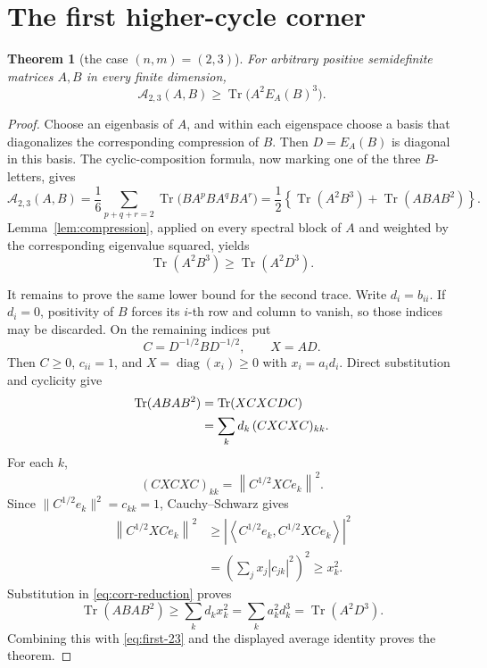 \documentclass[11pt]{article}
\newtheorem{theorem}{Theorem}[section]
\newcommand{\Tr}{\operatorname{Tr}}
\newcommand{\Aav}{\mathcal A}
\newcommand{\EA}{E_A}
\begin{document}
\section{The first higher-cycle corner}
\begin{theorem}[the case \((n,m)=(2,3)\)]\label{thm:twothree}
For arbitrary positive semidefinite matrices \(A,B\) in every finite
dimension,
\[
 \Aav_{2,3}(A,B)\geq \Tr\bigl(A^2\EA(B)^3\bigr).
\]
\end{theorem}
\begin{proof}
Choose an eigenbasis of \(A\), and within each eigenspace choose a basis
that diagonalizes the corresponding compression of \(B\). Then
\(D=\EA(B)\) is diagonal in this basis. The cyclic-composition formula,
now marking one of the three \(B\)-letters, gives
\[
 \Aav_{2,3}(A,B)
 =\frac{1}{6}\sum_{p+q+r=2}
   \Tr\bigl(BA^pBA^qBA^r\bigr)
 =\frac12\left\{\Tr(A^2B^3)+\Tr(ABAB^2)\right\}.
\]
Lemma~\ref{lem:compression}, applied on every spectral block of \(A\) and
weighted by the corresponding eigenvalue squared, yields
\begin{equation}\label{eq:first-23}
 \Tr(A^2B^3)\geq\Tr(A^2D^3).
\end{equation}

It remains to prove the same lower bound for the second trace. Write
\(d_i=b_{ii}\). If \(d_i=0\), positivity of \(B\) forces its \(i\)-th row
and column to vanish, so those indices may be discarded. On the remaining
indices put
\[
 C=D^{-1/2}BD^{-1/2},
 \qquad X=AD.
\]
Then \(C\geq0\), \(c_{ii}=1\), and \(X=\operatorname{diag}(x_i)\geq0\)
with \(x_i=a_i d_i\). Direct substitution and cyclicity give
\begin{align}
 \Tr(ABAB^2)
 &=\Tr(XCXC DC)\notag\\
 &=\sum_k d_k\,(CXCXC)_{kk}.\label{eq:corr-reduction}
\end{align}
For each \(k\),
\[
 (CXCXC)_{kk}
 =\left\|C^{1/2}XC e_k\right\|^2.
\]
Since \(\|C^{1/2}e_k\|^2=c_{kk}=1\), Cauchy--Schwarz gives
\begin{align*}
 \left\|C^{1/2}XC e_k\right\|^2
 &\geq
 \left|\left\langle C^{1/2}e_k,C^{1/2}XC e_k\right\rangle\right|^2\\
 &=\left(\sum_j x_j|c_{jk}|^2\right)^2
 \geq x_k^2.
\end{align*}
Substitution in \eqref{eq:corr-reduction} proves
\[
 \Tr(ABAB^2)\geq\sum_k d_kx_k^2
 =\sum_k a_k^2d_k^3
 =\Tr(A^2D^3).
\]
Combining this with \eqref{eq:first-23} and the displayed average identity
proves the theorem.
\end{proof}
\end{document}
